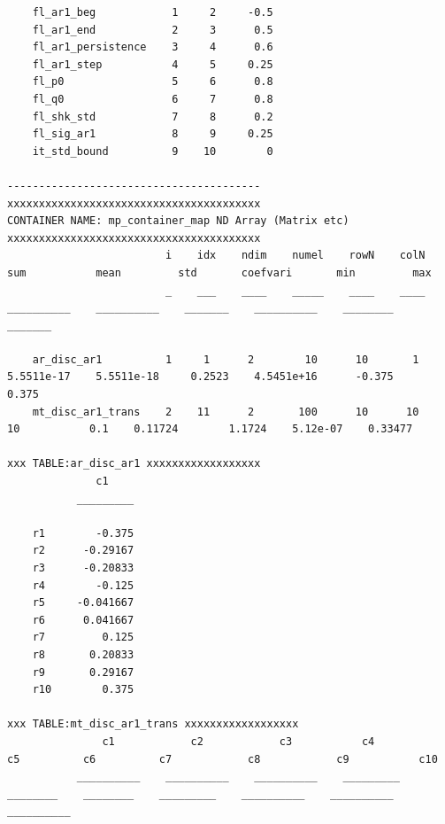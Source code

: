 \documentclass[
]{book}
\begin{document}
\begin{verbatim}
    fl_ar1_beg            1     2     -0.5 
    fl_ar1_end            2     3      0.5 
    fl_ar1_persistence    3     4      0.6 
    fl_ar1_step           4     5     0.25 
    fl_p0                 5     6      0.8 
    fl_q0                 6     7      0.8 
    fl_shk_std            7     8      0.2 
    fl_sig_ar1            8     9     0.25 
    it_std_bound          9    10        0 

----------------------------------------
xxxxxxxxxxxxxxxxxxxxxxxxxxxxxxxxxxxxxxxx
CONTAINER NAME: mp_container_map ND Array (Matrix etc)
xxxxxxxxxxxxxxxxxxxxxxxxxxxxxxxxxxxxxxxx
                         i    idx    ndim    numel    rowN    colN       sum           mean         std       coefvari       min         max  
                         _    ___    ____    _____    ____    ____    __________    __________    _______    __________    ________    _______

    ar_disc_ar1          1     1      2        10      10       1     5.5511e-17    5.5511e-18     0.2523    4.5451e+16      -0.375      0.375
    mt_disc_ar1_trans    2    11      2       100      10      10             10           0.1    0.11724        1.1724    5.12e-07    0.33477

xxx TABLE:ar_disc_ar1 xxxxxxxxxxxxxxxxxx
              c1    
           _________

    r1        -0.375
    r2      -0.29167
    r3      -0.20833
    r4        -0.125
    r5     -0.041667
    r6      0.041667
    r7         0.125
    r8       0.20833
    r9       0.29167
    r10        0.375

xxx TABLE:mt_disc_ar1_trans xxxxxxxxxxxxxxxxxx
               c1            c2            c3           c4           c5          c6          c7            c8            c9           c10    
           __________    __________    __________    _________    ________    ________    _________    __________    __________    __________


\end{verbatim}
\end{document}

